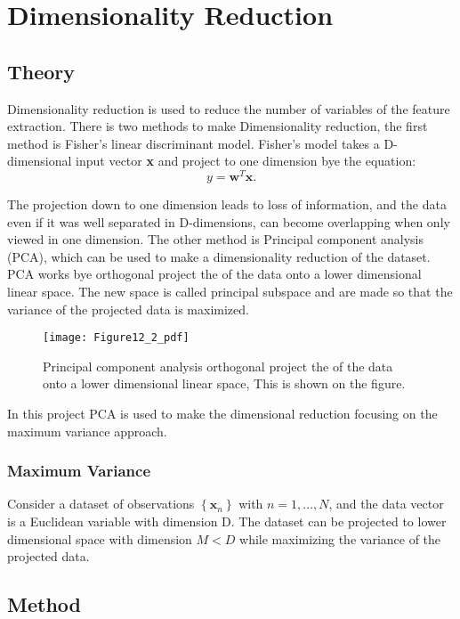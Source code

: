 \chapter{Dimensionality Reduction}
\section{Theory}
Dimensionality reduction is used to reduce the number of variables of the feature extraction.
There is two methods to make Dimensionality reduction, the first method is Fisher's linear discriminant model.
Fisher's model takes a D-dimensional input vector \textbf{x} and project to one dimension bye the equation:
\begin{equation}
y = \mathbf{w}^T \mathbf{x}.
\label{eq:fisher}
\end{equation} 

The projection down to one dimension leads to loss of information, and the data even if it was well separated in D-dimensions, can become overlapping when only viewed in one dimension.
The other method is Principal component analysis (PCA), which can be used to make a dimensionality reduction of the dataset.
PCA works bye orthogonal project the of the data onto a lower dimensional linear space.
The new space is called principal subspace and are made so that the variance of the projected data is maximized. 

\begin{figure}[H]
\centering
\texttt{[image: Figure12\_2\_pdf]}
\caption{Principal component analysis orthogonal project the of the data onto a lower dimensional linear space, This is shown on the figure. }
\label{fig:dim_PCA_book}
\end{figure}

In this project PCA is used to make the dimensional reduction focusing on the maximum variance approach.

\subsection{Maximum Variance}
Consider a dataset of observations $ \left\lbrace \mathbf{x}_n \right\rbrace $ with $ n = 1,...,N $, and the data vector is a Euclidean variable with dimension D. 
The dataset can be projected to lower dimensional space with dimension $ M<D $ 	while maximizing the variance of the projected data. 



\section{Method}

